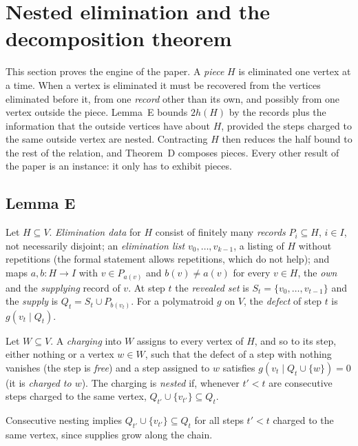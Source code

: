 \section{Nested elimination and the decomposition theorem}\label{sec:engine}

This section proves the engine of the paper. A \emph{piece} $H$ is eliminated one vertex at a time. When a vertex is
eliminated it must be recovered from the vertices eliminated before it, from one \emph{record} other than its own, and
possibly from one vertex outside the piece. Lemma~E bounds $2h(H)$ by the records plus the information that the outside
vertices have about $H$, provided the steps charged to the same outside vertex are nested. Contracting $H$ then reduces
the half bound to the rest of the relation, and Theorem~D composes pieces. Every other result of the paper is an
instance: it only has to exhibit pieces.

\subsection{Lemma E}\label{sec:lemmaE}

\begin{definition}\label{def:elim-data}
Let $H\subseteq V$. \emph{Elimination data} for $H$ consist of finitely many \emph{records} $P_i\subseteq H$, $i\in I$,
not necessarily disjoint; an \emph{elimination list} $v_0,\dots,v_{k-1}$, a listing of $H$ without repetitions (the
formal statement allows repetitions, which do not help); and maps $a,b\colon H\to I$ with $v\in P_{a(v)}$ and $b(v)\ne a(v)$ for every $v\in H$, the \emph{own} and the
\emph{supplying} record of $v$. At step $t$ the \emph{revealed set} is $S_t=\{v_0,\dots,v_{t-1}\}$ and the
\emph{supply} is $Q_t=S_t\cup P_{b(v_t)}$. For a polymatroid $g$ on $V$, the \emph{defect} of step $t$ is
$g(v_t\mid Q_t)$.

Let $W\subseteq V$. A \emph{charging} into $W$ assigns to every vertex of $H$, and so to its step, either nothing or a
vertex $w\in W$, such that the defect of a step with nothing vanishes (the step is \emph{free}) and a step assigned to $w$ satisfies
$g(v_t\mid Q_t\cup\{w\})=0$ (it is \emph{charged to $w$}). The charging is \emph{nested} if, whenever $t'<t$ are
consecutive steps charged to the same vertex, $Q_{t'}\cup\{v_{t'}\}\subseteq Q_t$.
\end{definition}

Consecutive nesting implies $Q_{t'}\cup\{v_{t'}\}\subseteq Q_t$ for all steps $t'<t$ charged to the same vertex,
since supplies grow along the chain.

